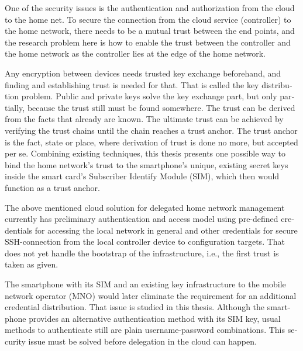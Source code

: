 \documentclass[12pt,a4paper,english]{tutthesis}
\begin{document}
\begin{otherlanguage}{english}
One of the security issues is the authentication and authorization 
from the cloud to the home net.
To secure the connection from the cloud service (controller)
to the home network, there needs to be a mutual trust between the end
points, and the research problem here is how to enable the trust between the
controller and the home network as the controller lies at the edge of the
home network.



Any encryption between devices needs trusted key exchange beforehand,
and finding and establishing trust is needed for that.  That is called
the key distribution problem. Public and private keys solve the key exchange part, but
only partially, because the trust still must be found somewhere.
The trust can be derived from the facts that already are known.  
The ultimate trust can be achieved by verifying the trust chains 
until the chain reaches a trust anchor.
The trust anchor is the fact, state or place,
where derivation of trust is done no more, but accepted per se.
Combining existing techniques, this thesis presents one possible way
to bind the home network's trust to the smartphone's unique, existing
secret keys inside the smart card's Subscriber Identify Module (SIM),
which then would function as a trust anchor. 



The above mentioned cloud solution for delegated home network
management currently has preliminary authentication and access model
using pre-defined credentials for accessing the local network in general and other
credentials for secure SSH-connection from the local
controller device to configuration
targets\cite[Chap.4]{silverajan2015collaborative}.
That does not yet handle the bootstrap of the 
infrastructure, i.e., the first trust is taken as given. 

The smartphone with its SIM and an
existing key infrastructure to the mobile
network operator (MNO) would later eliminate the requirement for an
additional credential distribution. That issue is studied in this
thesis.  Although the smartphone provides an alternative authentication
method with its SIM key, usual methods to authenticate still are plain
username-password combinations.  This security issue must be solved
before delegation in the cloud can happen.












\end{otherlanguage}
\end{document}

